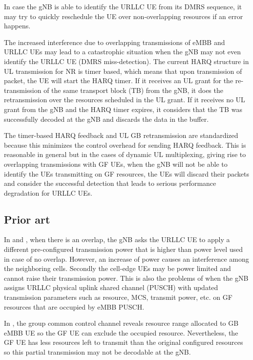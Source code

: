 \documentclass[conference]{IEEEtran}
\begin{document}
In case the gNB is able to identify the URLLC UE from its DMRS sequence, it may try to quickly reschedule the UE over non-overlapping resources if an error happens.

The increased interference due to overlapping transmissions of eMBB and URLLC UEs may lead to a catastrophic situation when the gNB may not even identify the URLLC UE (DMRS miss-detection). The current HARQ structure in UL transmission for NR is timer based, which means that upon transmission of packet, the UE will start the HARQ timer. If it receives an UL grant for the re-transmission of the same transport block (TB) from the gNB, it does the retransmission over the resources scheduled in the UL grant. If it receives no UL grant from the gNB and the HARQ timer expires, it considers that the TB was successfully decoded at the gNB and discards the data in the buffer. 

The timer-based HARQ feedback and UL GB retransmission are standardized because this minimizes the control overhead for sending HARQ feedback. This is reasonable in general but in the cases of dynamic UL multiplexing, giving rise to overlapping transmissions with GF UEs, when the gNB will not be able to identify the UEs transmitting on GF resources, the UEs will discard their packets and consider the successful detection that leads to serious performance degradation for URLLC UEs.

\subsection{Prior art}\label{ICC}
In \cite{b2} and \cite{b3}, when there is an overlap, the gNB asks the URLLC UE to apply a different pre-configured transmission power that is higher than power level used in case of no overlap. However, an increase of power causes an interference among the neighboring cells. Secondly the cell-edge UEs may be power limited and cannot raise their transmission power. This is also the problems of \cite{b5} when the gNB assigns URLLC physical uplink shared channel (PUSCH) with updated transmission parameters such as resource, MCS, transmit power, etc. on GF resources that are occupied by eMBB PUSCH. 

In \cite{b7}, the group common control channel reveals resource range allocated to GB eMBB UE so the GF UE can exclude the occupied resource. Nevertheless, the GF UE has less resources left to transmit than the original configured resources so this partial transmission may not be decodable at the gNB.
\end{document}
